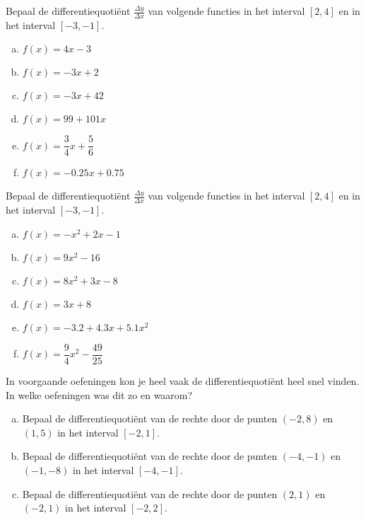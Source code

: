 \documentclass[12pt]{article}
\begin{document}
\pagestyle{plain}


\begin{oefening}
Bepaal de differentiequotiënt $\frac{\Delta y}{\Delta x}$ van volgende functies in het interval $[2,4]$ en in het interval $[-3,-1]$.
\begin{multicols}{3}
\begin{enumerate}[(a)]
  \itemsep.2em
  \item $\displaystyle f(x)=4x-3$
  \item $\displaystyle f(x)=-3x+2$
  \item $\displaystyle f(x)=-3x+42$
  \item $\displaystyle f(x)=99+101x$
  \item $\displaystyle f(x)=\dfrac{3}{4}x+\dfrac{5}{6}$
  \item $\displaystyle f(x)=-0.25x+0.75$
\end{enumerate}
\end{multicols}
\end{oefening}

\begin{oefening}
Bepaal de differentiequotiënt $\frac{\Delta y}{\Delta x}$ van volgende functies in het interval $[2,4]$ en in het interval $[-3,-1]$.
\begin{multicols}{3}
\begin{enumerate}[(a)]
  \itemsep.2em
  \item $\displaystyle f(x)=-x^2+2x-1$
  \item $\displaystyle f(x)=9x^2-16$
  \item $\displaystyle f(x)=8x^2+3x-8$
  \item $\displaystyle f(x)=3x+8$
  \item $\displaystyle f(x)=-3.2+4.3x+5.1x^2$
  \item $\displaystyle f(x)=\dfrac{9}{4}x^2-\dfrac{49}{25}$
\end{enumerate}
\end{multicols}
\end{oefening}

\begin{oefening}
In voorgaande oefeningen kon je heel vaak de differentiequotiënt heel snel vinden. In welke oefeningen was dit zo en waarom?
\end{oefening}

\begin{oefening}
\begin{enumerate}[(a)]
  \item Bepaal de differentiequotiënt van de rechte door de punten $(-2,8)$ en $(1,5)$ in het interval $[-2,1]$.
  \item Bepaal de differentiequotiënt van de rechte door de punten $(-4,-1)$ en $(-1,-8)$ in het interval $[-4,-1]$.
  \item Bepaal de differentiequotiënt van de rechte door de punten $(2,1)$ en $(-2,1)$ in het interval $[-2,2]$.
\end{enumerate}
\end{oefening}
\end{document}
